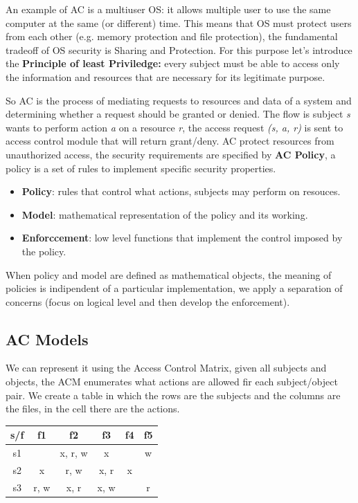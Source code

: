 An example of AC is a multiuser OS: it allows multiple user to use the same computer at the same (or different) time. This means that OS must protect users from each other (e.g. memory protection and file protection), the fundamental tradeoff of OS security is Sharing and Protection. For this purpose let's introduce the \textbf{Principle of least Priviledge:} every subject must be able to access only the information and resources that are necessary for its legitimate purpose.

So AC is the process of mediating requests to resources and data of a system and determining whether a request should be granted or denied. The flow is subject \textit{s} wants to perform action \textit{a} on a resource \textit{r}, the access request \textit{(s, a, r)} is sent to access control module that will return grant/deny. AC protect resources from unauthorized access, the security requirements are specified by \textbf{AC Policy}, a policy is a set of rules to implement specific security properties.

\begin{itemize}
    \item \textbf{Policy}: rules that control what actions, subjects may perform on resouces.
    \item \textbf{Model}: mathematical representation of the policy and its working.
    \item \textbf{Enforccement}: low level functions that implement the control imposed by the policy.
\end{itemize}
When policy and model are defined as mathematical objects, the meaning of policies is indipendent of a particular implementation, we apply a separation of concerns (focus on logical level and then develop the enforcement).

\subsection{AC Models}
We can represent it using the Access Control Matrix, given all subjects and objects, the ACM enumerates what actions are allowed fir each subject/object pair. We create a table in which the rows are the subjects and the columns are the files, in the cell there are the actions.
\begin{table}[h!]
    \centering
    \begin{tabular}{|c|c|c|c|c|c|}
    \hline
         s/f & f1 & f2 & f3 & f4 & f5 \\
         \hline
         s1  &    & x, r, w & x & & w\\
         \hline
         s2  & x  & r, w & x, r & x & \\
         \hline
         s3  & r, w  & x, r & x, w & & r\\
         \hline
    \end{tabular}
\end{table}

